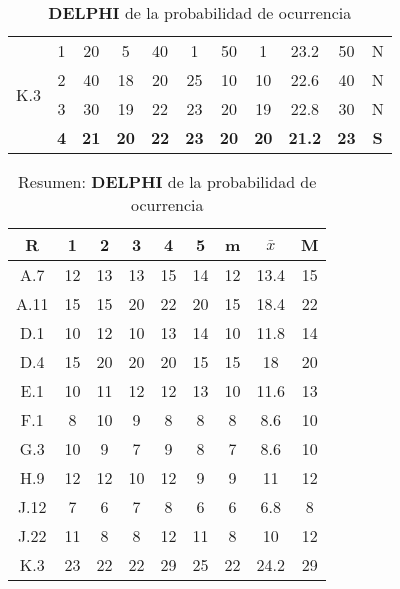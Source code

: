 \documentclass[11pt,a4paper,spanish,twoside]{book}
\begin{document}
\begin{table}[!h]
\begin{tabular}{|c|c||c|c|c|c|c||c|c|c||c|}
    \hline \multirow{4}{*}{K.3} 
    & 1 & 20 & 5  & 40 & 1  & 50 & 1  & 23.2 & 50 & N \\
    & 2 & 40 & 18 & 20 & 25 & 10 & 10 & 22.6 & 40 & N \\
    & 3 & 30 & 19 & 22 & 23 & 20 & 19 & 22.8 & 30 & N \\
    & \textbf{4} & \textbf{21} & \textbf{20} & \textbf{22} & \textbf{23} &
    \textbf{20} & \textbf{20} & \textbf{21.2} & \textbf{23} & \textbf{S} \\ 
   \end{tabular}
  \caption{\textbf{DELPHI} de la probabilidad de ocurrencia}
  \label{Tab:DELPHIpro}
\end{table}

\begin{table}[!h]
\centering
  \begin{tabular}{|c||c|c|c|c|c||c|c|c|}
    \hline
    \textbf{R} & \textbf{1} & \textbf{2} & \textbf{3} & \textbf{4} &
    \textbf{5} & \textbf{m} &\textbf{$\bar{x}$} &\textbf{M} \\
    \hline
    A.7  & 12 & 13 & 13 & 15 & 14 & 12 & 13.4 & 15 \\ \hline
    A.11 & 15 & 15 & 20 & 22 & 20 & 15 & 18.4 & 22 \\ \hline
    D.1  & 10 & 12 & 10 & 13 & 14 & 10 & 11.8 & 14 \\ \hline
    D.4  & 15 & 20 & 20 & 20 & 15 & 15 & 18   & 20 \\ \hline
    E.1  & 10 & 11 & 12 & 12 & 13 & 10 & 11.6 & 13 \\ \hline
    F.1  & 8  & 10 & 9  & 8  & 8  & 8  & 8.6  & 10 \\ \hline
    G.3  & 10 & 9  & 7  & 9  & 8  & 7  & 8.6  & 10 \\ \hline
    H.9  & 12 & 12 & 10 & 12 & 9  & 9  & 11   & 12 \\ \hline
    J.12 & 7  & 6  & 7  & 8  & 6  & 6  & 6.8  & 8  \\ \hline
    J.22 & 11 & 8  & 8  & 12 & 11 & 8  & 10   & 12 \\ \hline
    K.3  & 23 & 22 & 22 & 29 & 25 & 22 & 24.2 & 29 \\ \hline
  \end{tabular}
  \caption{Resumen: \textbf{DELPHI} de la probabilidad de ocurrencia}
  \label{Tab:ResDELPHIpro}
\end{table}
\end{document}
